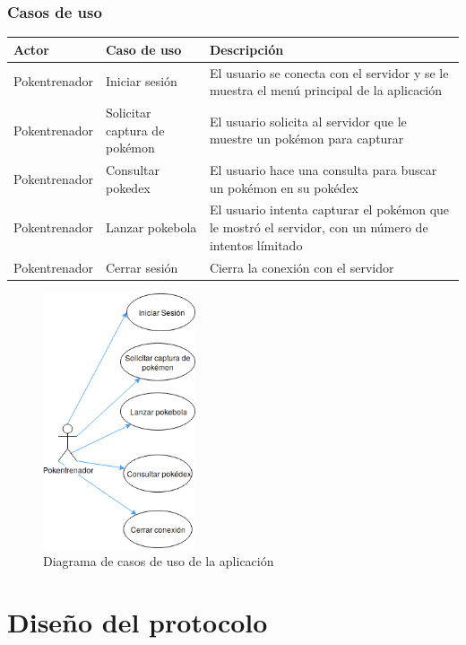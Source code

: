 \documentclass[12pt]{article}
\begin{document}
 \subsubsection{Casos de uso}
 \begin{center}
   \begin{tabular}{|l|p{5cm}|p{9cm}|}
     \hline
     Actor & Caso de uso & Descripción \\
     \hline
     Pokentrenador & Iniciar sesión & El usuario se conecta con el servidor y se le muestra el menú principal de la aplicación \\ \hline
     Pokentrenador & Solicitar captura de pokémon & El usuario solicita al servidor que le muestre un pokémon para capturar \\ \hline
     Pokentrenador & Consultar pokedex & El usuario hace una consulta para buscar un pokémon en su pokédex \\ \hline
     Pokentrenador & Lanzar pokebola & El usuario intenta capturar el pokémon que le mostró el servidor, con un número de intentos límitado \\ \hline
     Pokentrenador & Cerrar sesión & Cierra la conexión con el servidor \\
     \hline
   \end{tabular}
 \end{center}
 \begin{figure}[H]
   \centering
   \includegraphics[width=0.4\textwidth]{casosdeuso}
   \caption{Diagrama de casos de uso de la aplicación}
 \end{figure}
 
\section{Diseño del protocolo}
\end{document}
